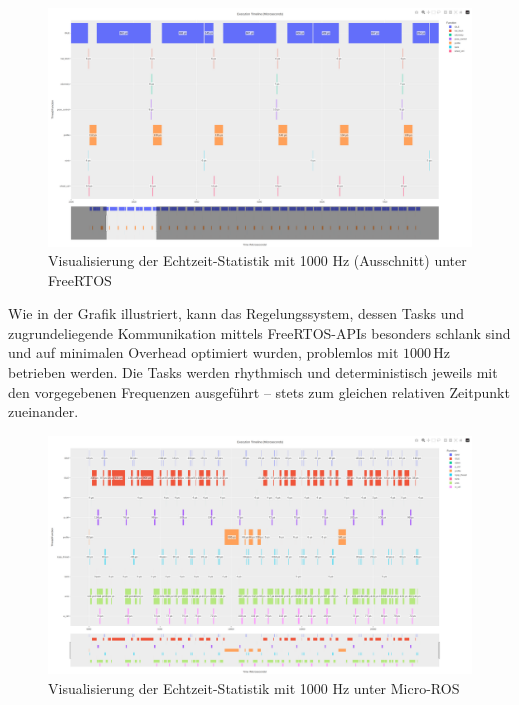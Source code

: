 \begin{figure}[H]
    \centering
    \includegraphics[width=1\textwidth]{assets/freertos_profiling_1000hz_ausschnitt}
    \caption{Visualisierung der Echtzeit-Statistik mit 1000 Hz (Ausschnitt)
    unter FreeRTOS}
\end{figure}

Wie in der Grafik illustriert, kann das Regelungssystem, dessen Tasks und
zugrundeliegende Kommunikation mittels FreeRTOS-APIs besonders schlank sind und
auf minimalen Overhead optimiert wurden, problemlos mit $1000\,\text{Hz}$
betrieben werden. Die Tasks werden rhythmisch und deterministisch jeweils mit
den vorgegebenen Frequenzen ausgeführt -- stets zum gleichen relativen Zeitpunkt
zueinander.

\begin{figure}[H]
    \centering
    \includegraphics[width=1\textwidth]{assets/micro_ros_profiling_1000hz}
    \caption{Visualisierung der Echtzeit-Statistik mit 1000 Hz unter Micro-ROS}
\end{figure}

